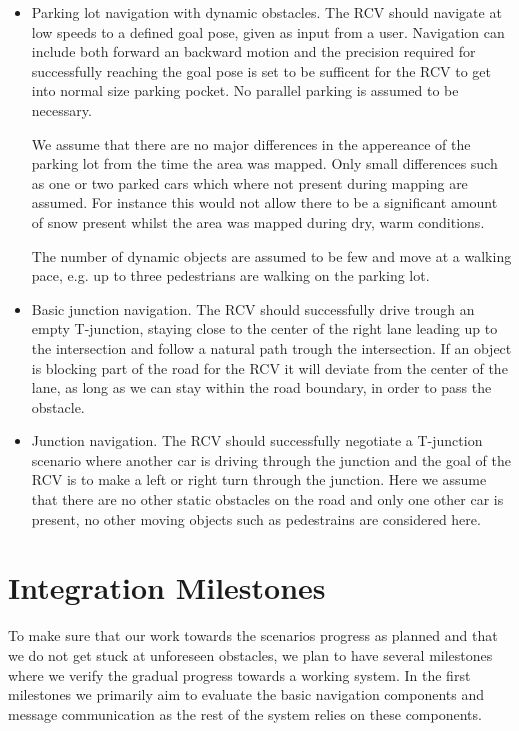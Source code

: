\documentclass[11pt,a4paper]{article}
\begin{document}
\begin{itemize}


\item Parking lot navigation with dynamic obstacles. The RCV should navigate at low speeds 
  to a defined goal pose, given as input from a user. Navigation
can include both forward an backward motion and the precision
required for successfully reaching the goal pose is set to be
sufficent for the RCV to get into normal size parking pocket. No
parallel parking is assumed to be necessary.

We assume that there are no major differences in the appereance of the
parking lot from the time the area was mapped. Only small differences
such as one or two parked cars which where not present during mapping
are assumed. For instance this would not allow there to be a
significant amount of snow present whilst the area was mapped during
dry, warm conditions.

The number of dynamic objects are assumed to be few and move at a 
walking pace, e.g. up to three pedestrians are walking on the parking lot.

\item Basic junction navigation. The RCV should successfully drive
  trough an empty T-junction, staying close to the center of the right
  lane leading up to the intersection and follow a natural path trough the intersection.
  If an object is blocking part of the road for the RCV it will deviate from the center of the
  lane, as long as we can stay within the road boundary, in order to pass the obstacle.

\item Junction navigation. The RCV should successfully negotiate a
  T-junction scenario where another car is driving through the
  junction and the goal of the RCV is to make a left or right turn
  through the junction. Here we assume that there are no
  other static obstacles on the road and only one other car is present, no other moving
objects such as pedestrains are considered here.

\end{itemize}

\section{Integration Milestones}

To make sure that our work towards the scenarios progress as planned and that
we do not get stuck at unforeseen obstacles, we plan to have several milestones
where we verify the gradual progress towards a working system.
In the first milestones we primarily aim to evaluate the basic navigation components
and message communication as the rest of the system relies on these components.
\end{document}
